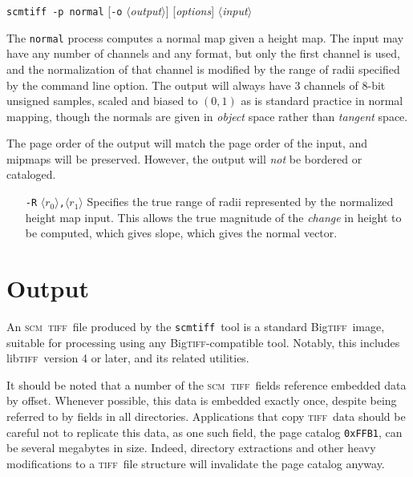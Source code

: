 \documentclass[oneside,11pt]{memoir}
\newcommand{\scm}     {\textsc{scm}}
\newcommand{\tiff}    {\textsc{tiff}}
\newcommand{\bigtiff} {Big\textsc{tiff}}
\newcommand{\libtiff} {lib\textsc{tiff}}
\newcommand{\scmtiff} {\texttt{scmtiff}}
\newcommand{\inangles}[1]{$\langle$#1$\rangle$}
\begin{document}
\begin{Spacing}{1.1}
\noindent\scmtiff\ \texttt{-p normal} [\texttt{-o} \inangles{\textit{output}}] [\textit{options}] \inangles{\textit{input}}

\bigskip The \texttt{normal} process computes a normal map given a height map. The input may have any number of channels and any format, but only the first channel is used, and the normalization of that channel is modified by the range of radii specified by the command line option. The output will always have 3 channels of 8-bit unsigned samples, scaled and biased to $(0,1)$ as is standard practice in normal mapping, though the normals are given in \emph{object} space rather than \emph{tangent} space.

The page order of the output will match the page order of the input, and mipmaps will be preserved. However, the output will \emph{not} be bordered or cataloged.

\begin{itemize}
\item[\texttt{-R} \inangles{$r_0$}\texttt{,}\inangles{$r_1$}] Specifies the true range of radii represented by the normalized height map input. This allows the true magnitude of the \emph{change} in height to be computed, which gives slope, which gives the normal vector.
\end{itemize}

\section{Output}

An \scm\ \tiff\ file produced by the \scmtiff\ tool is a standard \bigtiff\ image, suitable for processing using any \bigtiff-compatible tool. Notably, this includes \libtiff\ version 4 or later, and its related utilities.

It should be noted that a number of the \scm\ \tiff\ fields reference embedded data by offset. Whenever possible, this data is embedded exactly once, despite being referred to by fields in all directories. Applications that copy \tiff\ data should be careful not to replicate this data, as one such field, the page catalog \texttt{0xFFB1}, can be several megabytes in size. Indeed, directory extractions and other heavy modifications to a \tiff\ file structure will invalidate the page catalog anyway.


\end{Spacing}
\end{document}
